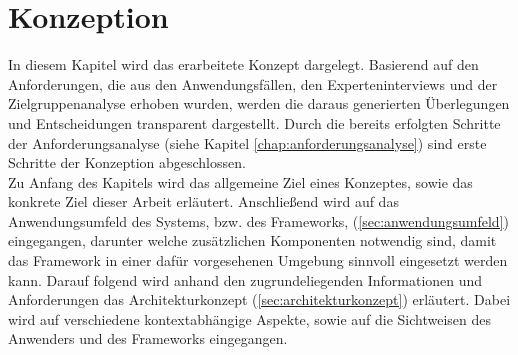 \chapter{Konzeption}
\label{chap:konzept}
    In diesem Kapitel wird das erarbeitete Konzept dargelegt. Basierend auf den 
    Anforderungen, die aus den Anwendungsfällen, den Experteninterviews und der Zielgruppenanalyse 
    erhoben wurden, werden die daraus generierten Überlegungen und Entscheidungen transparent 
    dargestellt. Durch die bereits erfolgten Schritte der Anforderungsanalyse (siehe Kapitel \ref{chap:anforderungsanalyse})
    sind erste Schritte der Konzeption abgeschlossen. 
    \\
    Zu Anfang des Kapitels wird das allgemeine Ziel eines Konzeptes, sowie das konkrete Ziel dieser Arbeit 
    erläutert. Anschließend 
    wird auf das Anwendungsumfeld des Systems, bzw. des Frameworks, (\ref{sec:anwendungsumfeld}) eingegangen, darunter 
    welche zusätzlichen Komponenten notwendig sind, damit das Framework in einer dafür vorgesehenen Umgebung sinnvoll 
    eingesetzt werden kann.
    Darauf folgend wird anhand den 
    zugrundeliegenden Informationen und Anforderungen das Architekturkonzept (\ref{sec:architekturkonzept}) erläutert. %
    Dabei wird auf verschiedene kontextabhängige Aspekte, sowie auf die Sichtweisen des Anwenders und des Frameworks eingegangen.

